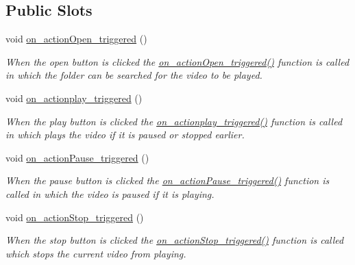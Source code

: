 \subsection*{Public Slots}
\begin{DoxyCompactItemize}
\item 
\mbox{\label{class_main_window_a48ed0a16f674e38e0e2a24274852a9af}} 
void \hyperlink{class_main_window_a48ed0a16f674e38e0e2a24274852a9af}{on\+\_\+action\+Open\+\_\+triggered} ()
\begin{DoxyCompactList}\small\item\em When the open button is clicked the \hyperlink{class_main_window_a48ed0a16f674e38e0e2a24274852a9af}{on\+\_\+action\+Open\+\_\+triggered()} function is called in which the folder can be searched for the video to be played. \end{DoxyCompactList}\item 
\mbox{\label{class_main_window_ab9167e4b9c446ef9d9b1b3a774bbeea5}} 
void \hyperlink{class_main_window_ab9167e4b9c446ef9d9b1b3a774bbeea5}{on\+\_\+actionplay\+\_\+triggered} ()
\begin{DoxyCompactList}\small\item\em When the play button is clicked the \hyperlink{class_main_window_ab9167e4b9c446ef9d9b1b3a774bbeea5}{on\+\_\+actionplay\+\_\+triggered()} function is called in which plays the video if it is paused or stopped earlier. \end{DoxyCompactList}\item 
\mbox{\label{class_main_window_a22563b69bbc711e70c8a568a9f453c59}} 
void \hyperlink{class_main_window_a22563b69bbc711e70c8a568a9f453c59}{on\+\_\+action\+Pause\+\_\+triggered} ()
\begin{DoxyCompactList}\small\item\em When the pause button is clicked the \hyperlink{class_main_window_a22563b69bbc711e70c8a568a9f453c59}{on\+\_\+action\+Pause\+\_\+triggered()} function is called in which the video is paused if it is playing. \end{DoxyCompactList}\item 
\mbox{\label{class_main_window_ac76431058c99a78cca019801d3f1ffbc}} 
void \hyperlink{class_main_window_ac76431058c99a78cca019801d3f1ffbc}{on\+\_\+action\+Stop\+\_\+triggered} ()
\begin{DoxyCompactList}\small\item\em When the stop button is clicked the \hyperlink{class_main_window_ac76431058c99a78cca019801d3f1ffbc}{on\+\_\+action\+Stop\+\_\+triggered()} function is called which stops the current video from playing. \end{DoxyCompactList}\end{DoxyCompactItemize}
